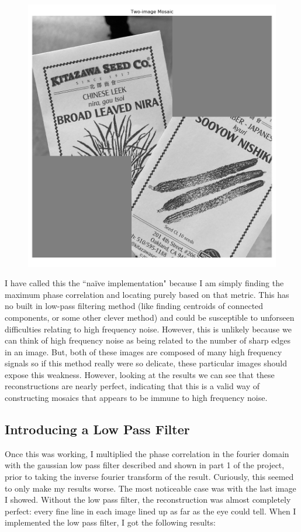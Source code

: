 \documentclass[]{article}
\begin{document}
\begin{figure}[H]
	\centering
	\includegraphics[width=6.5in]{p3_output/img_3_mosaic.png}
\end{figure}

\vskip 5pt
I have called this the ``na\"ive implementation" because I am simply finding the maximum phase correlation and locating purely based on that metric. This has no built in low-pass filtering method (like finding centroids of connected components, or some other clever method) and could be susceptible to unforseen difficulties relating to high frequency noise. However, this is unlikely because we can think of high frequency noise as being related to the number of sharp edges in an image. But, both of these images are composed of many high frequency signals so if this method really were so delicate, these particular images should expose this weakness. However, looking at the results we can see that these reconstructions are nearly perfect, indicating that this is a valid way of constructing mosaics that appears to be immune to high frequency noise.

\subsection{Introducing a Low Pass Filter}
Once this was working, I multiplied the phase correlation in the fourier domain with the gaussian low pass filter described and shown in part 1 of the project, prior to taking the inverse fourier transform of the result. Curiously, this seemed to only make my results worse. The most noticeable case was with the last image I showed. Without the low pass filter, the reconstruction was almost completely perfect: every fine line in each image lined up as far as the eye could tell. When I implemented the low pass filter, I got the following results:
\end{document}
